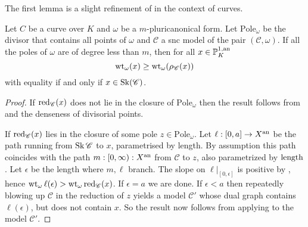 	The first lemma is a slight refinement of \cite[prop.\ 4.4.4]{mustataWeightFunctionsNonArchimedean2015} in the context of curves.
	\begin{lemma}\label{lem:well_behaved_pole_weight}
	Let $C$ be a curve over $K$ and $\omega$ be a $m$-pluricanonical form.
	Let $\mathrm{Pole}_\omega$ be the divisor that contains all points of $\omega$ and $\mathscr C$ a snc model of the pair $(\mathscr C, \omega)$.  
	If all the poles of $\omega$ are of degree less than $m$, then for all $x \in \mathbb{P}^{1, \text{an}}_K$ \[
		\operatorname{wt}_\omega(x) \ge \operatorname{wt}_\omega(\rho_{\mathscr C}(x))
	\] 
	with equality if and only if $x \in \operatorname{Sk}(\mathscr C)$. 
\end{lemma}
\begin{proof}
	If $\operatorname{red}_{\mathscr C}(x)$ does not lie in the closure of $\mathrm{Pole}_\omega$ then the result follows from \cite[prop.\ 4.4.4.(2)]{mustataWeightFunctionsNonArchimedean2015} and the denseness of divisorial points. 

	If $\operatorname{red}_{\mathscr C}(x)$ lies in the closure of some pole $z \in \mathrm{Pole}_\omega$. 
	Let $\ell: [0, a] \to X{}^{\text{an}}$ be the path running from $\operatorname{Sk} \mathscr C$ to $x$, parametrised by length. 
	By assumption this path coincides with the path $m: [0, \infty) : X{}^{\text{an}}$ from $\mathscr C$ to $z$, also parametrized by $\operatorname{length}$.
	Let $\epsilon$ be the length where $m, \ell$ branch. 
	The slope on  $\ell|_{[0, \epsilon]}$ is positive by \cite[thm.\ 3.2.3.(2)]{bakerWeightFunctionsBerkovich2016} , hence $\operatorname{wt}_\omega \ell(\epsilon) > \operatorname{wt}_\omega \operatorname{red}_{\mathscr C}(x)$.
	If $\epsilon = a$ we are done. 
	If $\epsilon < a$ then repeatedly blowing up $\mathscr C$ in the reduction of $z$ yields a model $\mathscr C'$ whose dual graph contains $\ell(\epsilon)$, but does not contain $x$.
	So the result now follows from applying \cite[prop.\ 4.4.4.(2)]{mustataWeightFunctionsNonArchimedean2015} to the model $\mathscr C'$. 
\end{proof}


